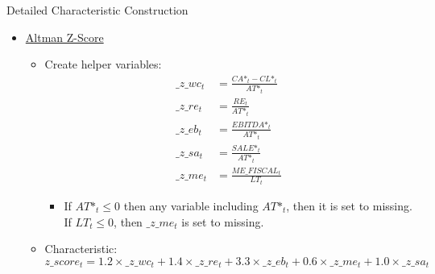 \documentclass[12pt,title,fleqn]{article}
\begin{document}
\begin{section}{Detailed Characteristic Construction}
\begin{itemize}
\begin{itemize}
                \item Characteristic:
                \begin{align*}
                    o\_score_t =& -1.37 - 0.407 \times \_o\_lat_t + 6.03 \times \_o\_lev_t + 1.43 \times \_o\_wc_t + \\ &0.076 \times \_o\_cacl_t - 1.72 \times \_o\_neg\_eq_t - 2.37 \times \_o\_roe_t - \\ &1.83 \times \_o\_ffo_t + 0.285 \times \_o\_neg\_earn_t - 0.52 \times \_o\_nich_t
                \end{align*}
            \end{itemize}
            
        \item \hyperlink{alt2}{\hypertarget{alt}{Altman Z-Score}}
            \begin{itemize}
                \item Create helper variables:
                    \begin{align*}
                        \_z\_wc_t &= \frac{CA\mbox{*}_t - CL\mbox{*}_t}{AT\mbox{*}_t} \\
                        \_z\_re_t &= \frac{RE_t}{AT\mbox{*}_t} \\
                        \_z\_eb_t &= \frac{EBITDA\mbox{*}_t}{AT\mbox{*}_t} \\
                        \_z\_sa_t &= \frac{SALE\mbox{*}_t}{AT\mbox{*}_t} \\
                        \_z\_me_t &= \frac{ME\_FISCAL_t}{LT_t}
                    \end{align*}
                
                    \begin{itemize}
                        \item If $AT\mbox{*}_t \leq 0$ then any variable including $AT\mbox{*}_t$, then it is set to missing. If $LT_t \leq 0$, then $\_z\_me_t$ is set to missing. 
                    \end{itemize}
                
                \item Characteristic: 
                    \begin{equation*}
                        z\_score_t = 1.2 \times \_z\_wc_t + 1.4 \times \_z\_re_t + 3.3 \times \_z\_eb_t + 0.6 \times \_z\_me_t + 1.0 \times \_z\_sa_t
                    \end{equation*}
            \end{itemize}


\end{itemize}
\end{section}
\end{document}
